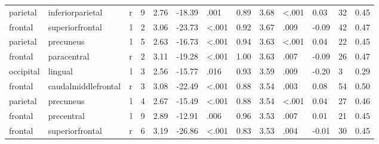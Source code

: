 \documentclass{article}
\begin{document}
\begin{longtable}{llrR{1.3cm}R{1cm}R{1.3cm}R{1cm}R{1cm}R{1.3cm}R{1cm}R{1.8cm}R{1.3cm}R{1.8cm}}
  parietal &          inferiorparietal &    r &         9 &                  2.76 &           -18.39 &               .001 &                               0.89 &                          3.68 &                   \textless.001 &   0.03 &     32 &      0.45 \\
   frontal &           superiorfrontal &    l &         2 &                  3.06 &           -23.73 &      \textless.001 &                               0.92 &                          3.67 &                            .009 &  -0.09 &     42 &      0.47 \\
  parietal &                 precuneus &    l &         5 &                  2.63 &           -16.73 &      \textless.001 &                               0.94 &                          3.63 &                   \textless.001 &   0.04 &     22 &      0.45 \\
   frontal &               paracentral &    r &         2 &                  3.11 &           -19.28 &      \textless.001 &                               1.00 &                          3.63 &                            .007 &  -0.09 &     26 &      0.47 \\
 occipital &                   lingual &    l &         3 &                  2.56 &           -15.77 &               .016 &                               0.93 &                          3.59 &                            .009 &  -0.20 &      3 &      0.29 \\
   frontal &       caudalmiddlefrontal &    r &         3 &                  3.08 &           -22.49 &      \textless.001 &                               0.88 &                          3.54 &                            .003 &   0.08 &     54 &      0.50 \\
  parietal &                 precuneus &    l &         4 &                  2.67 &           -15.49 &      \textless.001 &                               0.88 &                          3.54 &                   \textless.001 &   0.04 &     27 &      0.46 \\
   frontal &                precentral &    l &         9 &                  2.89 &           -12.91 &               .006 &                               0.96 &                          3.53 &                            .007 &   0.01 &     21 &      0.45 \\
   frontal &           superiorfrontal &    r &         6 &                  3.19 &           -26.86 &      \textless.001 &                               0.83 &                          3.53 &                            .004 &  -0.01 &     30 &      0.45 \\

\end{longtable}
\end{document}
